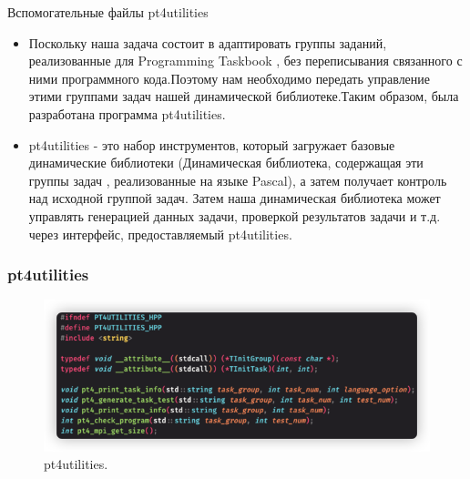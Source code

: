 
\begin{frame}{Вспомогательные файлы pt4utilities}

\begin{itemize}
    \item Поскольку наша задача состоит в адаптировать группы заданий, реализованные для Programming Taskbook \cite{ref2}, без переписывания связанного с ними программного кода.Поэтому нам необходимо передать управление этими группами задач нашей динамической библиотеке.Таким образом, была разработана программа pt4utilities.
    \item pt4utilities - это набор инструментов, который загружает базовые динамические библиотеки (Динамическая библиотека, содержащая эти группы задач , реализованные на языке Pascal), а затем получает контроль над исходной группой задач. Затем наша динамическая библиотека может управлять генерацией данных задачи, проверкой результатов задачи и т.д. через интерфейс, предоставляемый pt4utilities.
\end{itemize}

\end{frame}



\begin{frame}
\frametitle{pt4utilities}

\begin{figure}[htbp]%
    \centering
    \includegraphics[width=0.9\linewidth]{images/pt4.jpg}%
    \caption{pt4utilities.}%
    \label{pt4}%
\end{figure} 

\end{frame}

